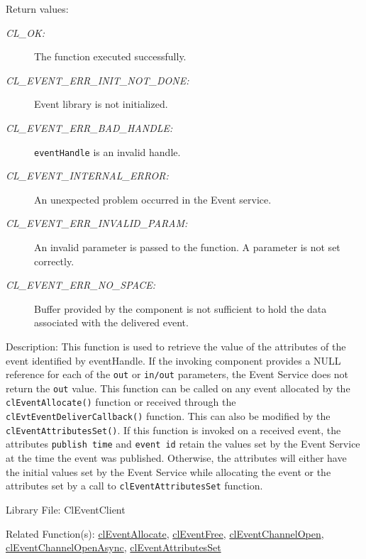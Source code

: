 \begin{flushleft}
\begin{Desc}
\end{Desc}
\begin{Desc}
\item[Return values:]
\begin{description}
\item[{\em CL\_\-OK:}]The function executed successfully. 
\item[{\em CL\_\-EVENT\_\-ERR\_\-INIT\_\-NOT\_\-DONE:}]Event library is not initialized. 
\item[{\em CL\_\-EVENT\_\-ERR\_\-BAD\_\-HANDLE:}]{\tt{eventHandle}} is an invalid handle. 
\item[{\em CL\_\-EVENT\_\-INTERNAL\_\-ERROR:}]An unexpected problem occurred in the Event service. 
\item[{\em CL\_\-EVENT\_\-ERR\_\-INVALID\_\-PARAM:}]An invalid parameter is passed to the function. A parameter is not set correctly.
\item[{\em CL\_\-EVENT\_\-ERR\_\-NO\_\-SPACE:}] Buffer provided by the component is not sufficient to hold the data associated with the delivered event.
\end{description}
\end{Desc}
\begin{Desc}
\item[Description:]
This function is used to retrieve the value of the attributes of the event identified by eventHandle. 
If the invoking component provides a NULL reference for each of the {\tt{out}} or {\tt{in/out}} parameters, 
the Event Service does not return the {\tt{out}} value. This function can be called on any event allocated
by the {\tt{clEventAllocate()}} function or received through the {\tt{clEvtEventDeliverCallback()}} function. This can also be modified by the 
{\tt{clEventAttributesSet()}}.
If this function is invoked on a received event, the attributes {\tt{publish time}} and {\tt{event id}} retain the values set by the Event Service 
at the time the event was published. 
Otherwise, the attributes will either have the initial values set by the Event Service while allocating the event or the attributes set by a call to
{\tt{clEventAttributesSet}} function. 
\end{Desc}
\begin{Desc}
\item[Library File:]Cl\-Event\-Client\end{Desc}
\begin{Desc}
\item[Related Function(s):]\hyperlink{pageem107}{cl\-Event\-Allocate}, \hyperlink{pageem108}{cl\-Event\-Free}, 
\hyperlink{pageem103}{cl\-Event\-Channel\-Open}, \hyperlink{pageem104}{cl\-Event\-Channel\-Open\-Async}, 
\hyperlink{pageem109}{cl\-Event\-Attributes\-Set} \end{Desc}
\newpage


\end{flushleft}
